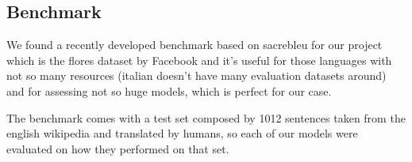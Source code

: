 \subsection{Benchmark}
We found a recently developed benchmark based on sacrebleu for our project which is the flores dataset\cite{goyal2021flores} by Facebook and it's useful for those languages with not so many resources (italian doesn't have many evaluation datasets around) and for assessing not so huge models, which is perfect for our case.
\vspace{3mm}

The benchmark comes with a test set composed by 1012 sentences taken from the english wikipedia and translated by humans, so each of our models were evaluated on how they performed on that set.
